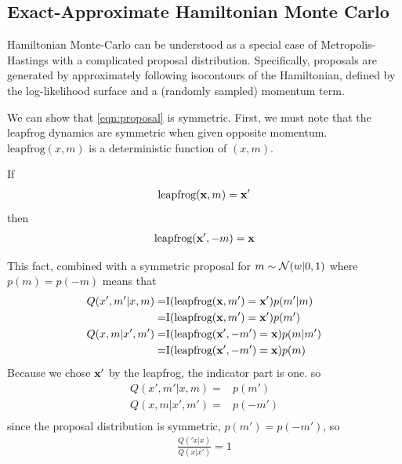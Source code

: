 \documentclass{article}
\begin{document}
\subsection{Exact-Approximate Hamiltonian Monte Carlo}

Hamiltonian Monte-Carlo can be understood as a special case of Metropolis-Hastings with a complicated proposal distribution.  Specifically, proposals are generated by approximately following isocontours of the Hamiltonian, defined by the log-likelihood surface and a (randomly sampled) momentum term.


We can show that \eqref{eqn:proposal} is symmetric.  First, we must note that the leapfrog dynamics are symmetric when given opposite momentum.  $\textrm{leapfrog}(x, m)$ is a deterministic function of $(x,m)$.

If
\begin{align}
\textrm{leapfrog}({\bf{x}}, m) = {\bf{x}}'
\end{align}
then
\begin{align}
\textrm{leapfrog}({\bf{x}}', -m) = {\bf{x}}
\end{align}

This fact, combined with a symmetric proposal for $m \sim \mathcal{N}\!\left(w|0,1\right)$ where $p(m) = p(-m)$ means that 
%
\begin{align}
Q( x', m' | x, m ) = & \textrm{I}( \textrm{leapfrog}({\bf{x}}, m') = {\bf{x}}' )p(m'|m) \\
= & \textrm{I}( \textrm{leapfrog}({\bf{x}}, m') = {\bf{x}}' )p(m') \\
Q( x, m | x', m' ) = & \textrm{I}( \textrm{leapfrog}({\bf{x}}', -m') = {\bf{x}} )p(m|m') \\
= & \textrm{I}( \textrm{leapfrog}({\bf{x}}', -m') = {\bf{x}} )p(m) \\
\end{align}
%
Because we chose ${\bf{x}}'$ by the leapfrog, the indicator part is one.  so
%
\begin{align}
Q( x', m' | x, m ) = & p(m') \\
Q( x, m | x', m' ) = & p(-m') \\
\end{align}
%
since the proposal distribution is symmetric, $p(m') = p(-m')$, so
\begin{align}
\frac{Q( 'x | x )}{Q( x | x' )} = 1
\end{align}
\end{document}
